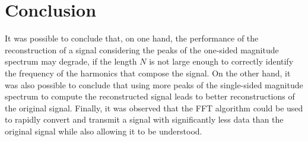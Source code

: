 \documentclass[a4paper, oneside, 11pt]{article}
\begin{document}
\section{Conclusion}

It was possible to conclude that, on one hand, the performance of the reconstruction of a signal considering the peaks of the one-sided magnitude spectrum may degrade, if the length $N$ is not large enough to correctly identify the frequency of the harmonics that compose the signal. On the other hand, it was also possible to conclude that using more peaks of the single-sided magnitude spectrum to compute the reconstructed signal leads to better reconstructions of the original signal. Finally, it was observed that the FFT algorithm could be used to rapidly convert and transmit a signal with significantly less data than the original signal while also allowing it to be understood.
\end{document}
